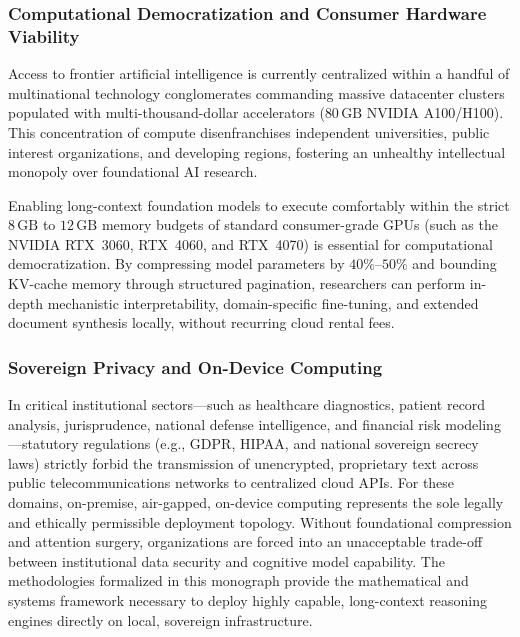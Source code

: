 \subsubsection{Computational Democratization and Consumer Hardware Viability}
\label{subsubsec:democratization}

Access to frontier artificial intelligence is currently centralized within a handful of multinational technology conglomerates commanding massive datacenter clusters populated with multi-thousand-dollar accelerators ($80\,\text{GB}$ NVIDIA A100/H100).
This concentration of compute disenfranchises independent universities, public interest organizations, and developing regions, fostering an unhealthy intellectual monopoly over foundational AI research.

Enabling long-context foundation models to execute comfortably within the strict $8\,\text{GB}$ to $12\,\text{GB}$ memory budgets of standard consumer-grade GPUs (such as the NVIDIA RTX~3060, RTX~4060, and RTX~4070) is essential for computational democratization.
By compressing model parameters by $40\%\text{--}50\%$ and bounding KV-cache memory through structured pagination, researchers can perform in-depth mechanistic interpretability, domain-specific fine-tuning, and extended document synthesis locally, without recurring cloud rental fees.

\subsubsection{Sovereign Privacy and On-Device Computing}
\label{subsubsec:sovereign_privacy}

In critical institutional sectors—such as healthcare diagnostics, patient record analysis, jurisprudence, national defense intelligence, and financial risk modeling—statutory regulations (e.g., GDPR, HIPAA, and national sovereign secrecy laws) strictly forbid the transmission of unencrypted, proprietary text across public telecommunications networks to centralized cloud APIs.
For these domains, on-premise, air-gapped, on-device computing represents the sole legally and ethically permissible deployment topology.
Without foundational compression and attention surgery, organizations are forced into an unacceptable trade-off between institutional data security and cognitive model capability.
The methodologies formalized in this monograph provide the mathematical and systems framework necessary to deploy highly capable, long-context reasoning engines directly on local, sovereign infrastructure.


